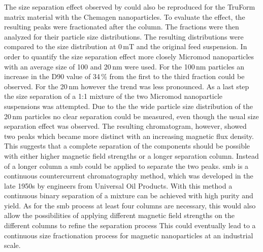 The size separation effect observed by \cite{AndreMaster} could also be reproduced for the TruForm matrix material with the Chemagen nanoparticles. To evaluate the effect, the resulting peaks were fractionated after the column. The fractions were then analyzed for their particle size distributions. The resulting distributions were compared to the size distribution at 0\,mT and the original feed suspension. In order to quantify the size separation effect more closely Micromod nanoparticles with an average size of 100 and 20\,nm were used. For the 100\,nm particles an increase in the D90 value of 34\,\% from the first to the third fraction could be observed. For the 20\,nm however the trend was less pronounced. As a last step the size separation of a 1:1 mixture of the two Micromod nanoparticle suspensions was attempted. Due to the the wide particle size distribution of the 20\,nm particles no clear separation could be measured, even though the usual size separation effect was observed. The resulting chromatogram, however, showed two peaks which became more distinct with an increasing magnetic flux density. This suggests that a complete separation of the components should be possible with either higher magnetic field strengths or a longer separation column. Instead of a longer column a \gls{smb} could be applied to separate the two peaks. \Gls{smb} is a continuous countercurrent chromatography method, which was developed in the late 1950s by engineers from Universal Oil Products\cite{broughton1961continuous,carson1962rotary}. With this method a continuous binary separation of a mixture can be achieved with high purity and yield. As for the \gls{smb} process at least four columns are necessary, this would also allow the possibilities of applying different magnetic field strengths on the different columns to refine the separation process  This could eventually lead to a continuous size fractionation process for magnetic nanoparticles at an industrial scale.  
  